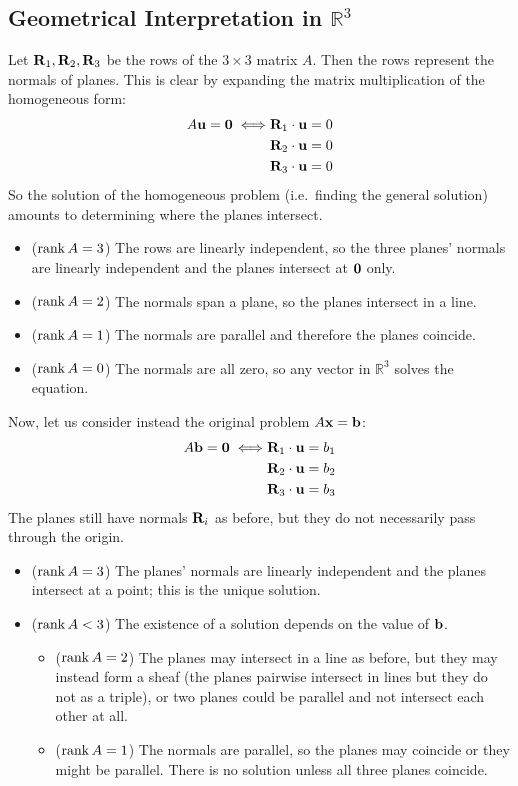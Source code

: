\subsection{Geometrical Interpretation in \(\mathbb R^3\)}
Let \(\vb R_1, \vb R_2, \vb R_3\) be the rows of the \(3 \times 3\) matrix \(A\).
Then the rows represent the normals of planes.
This is clear by expanding the matrix multiplication of the homogeneous form:
\begin{align*}
	A\vb u = \vb 0 \iff & \vb R_1 \cdot \vb u = 0 \\
	                    & \vb R_2 \cdot \vb u = 0 \\
	                    & \vb R_3 \cdot \vb u = 0
\end{align*}
So the solution of the homogeneous problem (i.e.\ finding the general solution) amounts to determining where the planes intersect.
\begin{itemize}
	\item (\(\rank A = 3\)) The rows are linearly independent, so the three planes' normals are linearly independent and the planes intersect at \(\vb 0\) only.
	\item (\(\rank A = 2\)) The normals span a plane, so the planes intersect in a line.
	\item (\(\rank A = 1\)) The normals are parallel and therefore the planes coincide.
	\item (\(\rank A = 0\)) The normals are all zero, so any vector in \(\mathbb R^3\) solves the equation.
\end{itemize}
Now, let us consider instead the original problem \(A \vb x = \vb b\):
\begin{align*}
	A\vb b = \vb 0 \iff & \vb R_1 \cdot \vb u = b_1 \\
	                    & \vb R_2 \cdot \vb u = b_2 \\
	                    & \vb R_3 \cdot \vb u = b_3
\end{align*}
The planes still have normals \(\vb R_i\) as before, but they do not necessarily pass through the origin.
\begin{itemize}
	\item (\(\rank A = 3\)) The planes' normals are linearly independent and the planes intersect at a point; this is the unique solution.
	\item (\(\rank A < 3\)) The existence of a solution depends on the value of \(\vb b\).
	      \begin{itemize}
		      \item (\(\rank A = 2\)) The planes may intersect in a line as before, but they may instead form a sheaf (the planes pairwise intersect in lines but they do not as a triple), or two planes could be parallel and not intersect each other at all.
		      \item (\(\rank A = 1\)) The normals are parallel, so the planes may coincide or they might be parallel.
		            There is no solution unless all three planes coincide.
	      \end{itemize}
\end{itemize}
